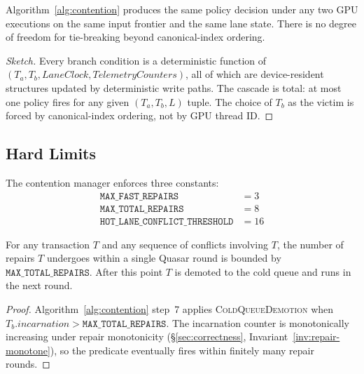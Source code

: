 \begin{lemma}
\label{lem:contention-deterministic}
Algorithm~\ref{alg:contention} produces the same policy decision
under any two GPU executions on the same input frontier and the
same lane state. There is no degree of freedom for tie-breaking
beyond canonical-index ordering.
\end{lemma}

\begin{proof}[Sketch]
Every branch condition is a deterministic function of
$(T_a, T_b, \mathit{LaneClock}, \mathit{TelemetryCounters})$, all of
which are device-resident structures updated by deterministic
write paths. The cascade is total: at most one policy fires for any
given $(T_a, T_b, L)$ tuple. The choice of $T_b$ as the victim is
forced by canonical-index ordering, not by GPU thread ID.
\end{proof}

\subsection{Hard Limits}

\begin{definition}
\label{def:hard-limits}
The contention manager enforces three constants:
\begin{align*}
\mathtt{MAX\_FAST\_REPAIRS}        &= 3 \\
\mathtt{MAX\_TOTAL\_REPAIRS}       &= 8 \\
\mathtt{HOT\_LANE\_CONFLICT\_THRESHOLD} &= 16
\end{align*}
\end{definition}

\begin{lemma}
\label{lem:bounded-retry}
For any transaction $T$ and any sequence of conflicts involving $T$,
the number of repairs $T$ undergoes within a single Quasar round is
bounded by $\mathtt{MAX\_TOTAL\_REPAIRS}$. After this point $T$ is
demoted to the cold queue and runs in the next round.
\end{lemma}

\begin{proof}
Algorithm~\ref{alg:contention} step~7 applies
\textsc{ColdQueueDemotion} when $T_b.\mathit{incarnation} >
\mathtt{MAX\_TOTAL\_REPAIRS}$. The incarnation counter is
monotonically increasing under repair monotonicity
(\S\ref{sec:correctness}, Invariant~\ref{inv:repair-monotone}), so the
predicate eventually fires within finitely many repair rounds.
\end{proof}

